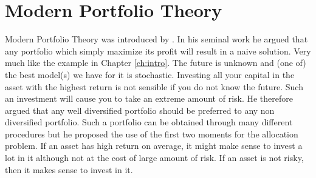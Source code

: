 \documentclass[]{book}\usepackage{knitr}
\begin{document}
\chapter{Modern Portfolio Theory}\label{ch:MPT}



Modern Portfolio Theory was introduced by \cite{markowitz1959portfolio}. 
In his seminal work he argued that any portfolio which simply maximize its profit will result in a naive solution.
Very much like the example in Chapter \ref{ch:intro}. 
The future is unknown and (one of) the best model(s) we have for it is stochastic.
Investing all your capital in the asset with the highest return is not sensible if you do not know the future.
Such an investment will cause you to take an extreme amount of risk. 
He therefore argued that any well diversified portfolio should be preferred to any non diversified portfolio. 
Such a portfolio can be obtained through many different procedures but he proposed the use of the first two moments for the allocation problem.
If an asset has high return on average, it might make sense to invest a lot in it although not at the cost of large amount of risk. If an asset is not risky, then it makes sense to invest in it.
\end{document}
